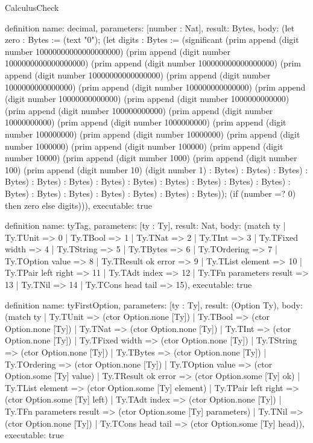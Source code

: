 \begin{lexlean}{CalculusCheck}
\begin{semanticmodule}
definition{
  name: decimal,
  parameters: [number : Nat],
  result: Bytes,
  body: (let zero : Bytes := (text "0"); (let digits : Bytes := (significant (prim append (digit number 10000000000000000000) (prim append (digit number 1000000000000000000) (prim append (digit number 100000000000000000) (prim append (digit number 10000000000000000) (prim append (digit number 1000000000000000) (prim append (digit number 100000000000000) (prim append (digit number 10000000000000) (prim append (digit number 1000000000000) (prim append (digit number 100000000000) (prim append (digit number 10000000000) (prim append (digit number 1000000000) (prim append (digit number 100000000) (prim append (digit number 10000000) (prim append (digit number 1000000) (prim append (digit number 100000) (prim append (digit number 10000) (prim append (digit number 1000) (prim append (digit number 100) (prim append (digit number 10) (digit number 1) : Bytes) : Bytes) : Bytes) : Bytes) : Bytes) : Bytes) : Bytes) : Bytes) : Bytes) : Bytes) : Bytes) : Bytes) : Bytes) : Bytes) : Bytes) : Bytes) : Bytes) : Bytes) : Bytes)); (if (number =? 0) then zero else digits))),
  executable: true
}

definition{
  name: tyTag,
  parameters: [ty : Ty],
  result: Nat,
  body: (match ty
    | Ty.TUnit => 0
    | Ty.TBool => 1
    | Ty.TNat => 2
    | Ty.TInt => 3
    | Ty.TFixed width => 4
    | Ty.TString => 5
    | Ty.TBytes => 6
    | Ty.TOrdering => 7
    | Ty.TOption value => 8
    | Ty.TResult ok error => 9
    | Ty.TList element => 10
    | Ty.TPair left right => 11
    | Ty.TAdt index => 12
    | Ty.TFn parameters result => 13
    | Ty.TNil => 14
    | Ty.TCons head tail => 15),
  executable: true
}

definition{
  name: tyFirstOption,
  parameters: [ty : Ty],
  result: (Option Ty),
  body: (match ty
    | Ty.TUnit => (ctor Option.none [Ty])
    | Ty.TBool => (ctor Option.none [Ty])
    | Ty.TNat => (ctor Option.none [Ty])
    | Ty.TInt => (ctor Option.none [Ty])
    | Ty.TFixed width => (ctor Option.none [Ty])
    | Ty.TString => (ctor Option.none [Ty])
    | Ty.TBytes => (ctor Option.none [Ty])
    | Ty.TOrdering => (ctor Option.none [Ty])
    | Ty.TOption value => (ctor Option.some [Ty] value)
    | Ty.TResult ok error => (ctor Option.some [Ty] ok)
    | Ty.TList element => (ctor Option.some [Ty] element)
    | Ty.TPair left right => (ctor Option.some [Ty] left)
    | Ty.TAdt index => (ctor Option.none [Ty])
    | Ty.TFn parameters result => (ctor Option.some [Ty] parameters)
    | Ty.TNil => (ctor Option.none [Ty])
    | Ty.TCons head tail => (ctor Option.some [Ty] head)),
  executable: true
}


\end{semanticmodule}
\end{lexlean}
